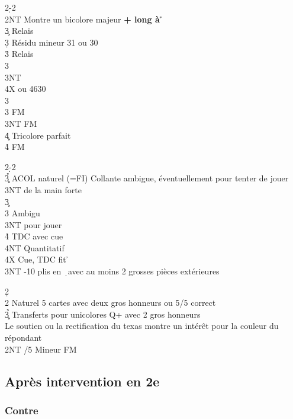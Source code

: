 \documentclass[a4paper]{article}
\begin{document}
\begin{bidtable}
2\d-2\h\\
2NT \> Montre un bicolore majeur \textbf{+ long à \h }\+\\
3\c \> Relais\+\\
3\d \> Résidu mineur 31 ou 30\+\\
3\h \> Relais\+\\
3\s {}\\
3NT \\
4X  ou 4630\-\-\\
3\h\\
3\s {} FM\\
3NT  FM\\
4\c\d \> Tricolore parfait\\
4\h {} FM\-\-
\end{bidtable}

\begin{bidtable}
2\d-2\h\\
3\c\d\h\s \> ACOL naturel (=FI) Collante ambigue, éventuellement pour tenter de jouer 3NT de la main forte\+\\
3\c\+\\
3\s \> Ambigu\+\\
3NT \> pour jouer\+\\
4\h \> TDC avec cue \s \\
4NT \> Quantitatif\-\-\\
4X \> Cue, TDC fit \h \-\\
3NT -10 plis en \d\ avec au moins 2 grosses pièces extérieures\-
\end{bidtable}

\begin{bidtable}
2\d\+\\
2\s \> Naturel 5 cartes avec deux gros honneurs ou 5/5 correct\\
3\c\d\h\s \> Transferts pour unicolores Q+ avec 2 gros honneurs\\
\>Le soutien ou la rectification du texas montre un intérêt pour la couleur du répondant\\
2NT /5 Mineur FM\-
\end{bidtable}

\subsection{Après intervention en 2e}

\subsubsection{Contre}
\end{document}
